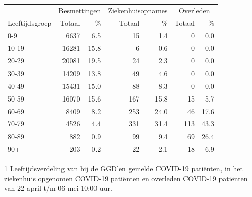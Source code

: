 \documentclass[
  english,
  man,floatsintext]{apa6}
\begin{document}
\begin{table}
\centering\begingroup\fontsize{11}{13}\selectfont

\begin{threeparttable}
\begin{tabular}{lrrrrrr}
\toprule
\multicolumn{1}{c}{ } & \multicolumn{2}{c}{Besmettingen} & \multicolumn{2}{c}{Ziekenhuisopnames} & \multicolumn{2}{c}{Overleden} \\
\cmidrule(l{3pt}r{3pt}){2-3} \cmidrule(l{3pt}r{3pt}){4-5} \cmidrule(l{3pt}r{3pt}){6-7}
Leeftijdsgroep & Totaal & \% & Totaal & \% & Totaal & \%\\
\midrule
0-9 & 6637 & 6.5 & 15 & 1.4 & 0 & 0.0\\
10-19 & 16281 & 15.8 & 6 & 0.6 & 0 & 0.0\\
20-29 & 20081 & 19.5 & 24 & 2.3 & 0 & 0.0\\
30-39 & 14209 & 13.8 & 49 & 4.6 & 0 & 0.0\\
40-49 & 15431 & 15.0 & 88 & 8.3 & 0 & 0.0\\
50-59 & 16070 & 15.6 & 167 & 15.8 & 15 & 5.7\\
60-69 & 8409 & 8.2 & 253 & 24.0 & 46 & 17.6\\
70-79 & 4526 & 4.4 & 331 & 31.4 & 113 & 43.3\\
80-89 & 882 & 0.9 & 99 & 9.4 & 69 & 26.4\\
90+ & 203 & 0.2 & 22 & 2.1 & 18 & 6.9\\
\bottomrule
\end{tabular}
\begin{tablenotes}
\item[1] Leeftijdsverdeling van bij de GGD’en gemelde COVID-19 patiënten, in het ziekenhuis opgenomen COVID-19 patiënten en overleden COVID-19 patiënten van 22 april t/m 06 mei 10:00 uur.
\end{tablenotes}
\end{threeparttable}
\endgroup{}
\end{table}

\newpage
\end{document}
